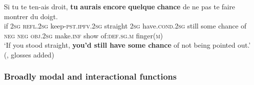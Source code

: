 \begin{exe}
	\ex\label{exAppendixFrenchEncoreIfOnly1Mod}
	\gll Si tu te ten-ais droit, \textbf{tu} \textbf{aurais} \textbf{encore} \textbf{quelque} \textbf{chance} de ne pas te faire montrer du doigt.\\
if 2\textsc{sg} \textsc{refl}.2\textsc{sg} keep-\textsc{pst}.\textsc{ipfv}.2\textsc{sg} straight 2\textsc{sg} have.\textsc{cond}.2\textsc{sg} still some chance of \textsc{neg} \textsc{neg} \textsc{obj}.2\textsc{sg} make.\textsc{inf} show of:\textsc{def}.\textsc{sg}.\textsc{m} finger(\textsc{m})\\
	\glt \lq If you stood straight, \textbf{you'd still have some chance} of not being pointed out.' (\cite[83]{VictorriFuchs1996}, glosses added)
\end{exe}

\subsubsection{Broadly modal and interactional functions}\label{appendixFrenchEncoreQ}
